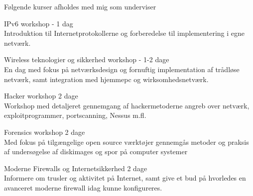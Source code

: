 \documentclass[20pt,landscape,a4paper,footrule]{foils}
\begin{document}
\begin{list1}
\item Følgende kurser afholdes med mig som underviser
\begin{list2}
\item IPv6 workshop - 1 dag\\
 Introduktion til Internetprotokollerne og forberedelse til
  implementering i egne netværk. 
\item Wireless teknologier og sikkerhed workshop - 1-2 dage\\
En dag med fokus på netværksdesign og fornuftig implementation af
trådløse netværk, samt integration med hjemmepc og
wirksomhedsnetværk. 
\item Hacker workshop 2 dage\\
Workshop med detaljeret gennemgang af hackermetoderne angreb over
netværk, exploitprogrammer, portscanning, Nessus m.fl.
\item Forensics workshop 2 dage\\
Med fokus på tilgængelige open source værktøjer gennemgås metoder og
praksis af undersøgelse af diskimages og spor på computer systemer
\item Moderne Firewalls og Internetsikkerhed 2 dage\\
Informere om trusler og aktivitet på Internet, samt give et bud
på hvorledes en avanceret moderne firewall idag kunne konfigureres.
\end{list2}
\end{list1}
\end{document}
